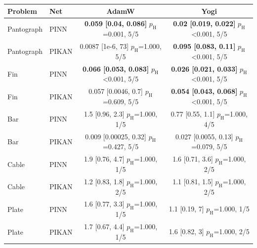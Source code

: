 \begin{tabular}{llcc}
\toprule
Problem & Net & AdamW & Yogi\\
\midrule
Pantograph & PINN & \makecell{\textbf{0.059 [0.04, 0.086]}\\{\footnotesize $p_{\mathrm{H}}$=0.001, 5/5}} & \makecell{\textbf{0.02 [0.019, 0.022]}\\{\footnotesize $p_{\mathrm{H}}$<0.001, 5/5}}\\
Pantograph & PIKAN & \makecell{0.0087 [1e-6, 73]\\{\footnotesize $p_{\mathrm{H}}$=1.000, 5/5}} & \makecell{\textbf{0.095 [0.083, 0.11]}\\{\footnotesize $p_{\mathrm{H}}$<0.001, 5/5}}\\
Fin & PINN & \makecell{\textbf{0.066 [0.053, 0.083]}\\{\footnotesize $p_{\mathrm{H}}$<0.001, 5/5}} & \makecell{\textbf{0.026 [0.021, 0.033]}\\{\footnotesize $p_{\mathrm{H}}$<0.001, 5/5}}\\
Fin & PIKAN & \makecell{0.057 [0.0046, 0.7]\\{\footnotesize $p_{\mathrm{H}}$=0.609, 5/5}} & \makecell{\textbf{0.054 [0.043, 0.068]}\\{\footnotesize $p_{\mathrm{H}}$<0.001, 5/5}}\\
Bar & PINN & \makecell{1.5 [0.96, 2.3]\\{\footnotesize $p_{\mathrm{H}}$=1.000, 1/5}} & \makecell{0.77 [0.55, 1.1]\\{\footnotesize $p_{\mathrm{H}}$=1.000, 4/5}}\\
Bar & PIKAN & \makecell{0.009 [0.00025, 0.32]\\{\footnotesize $p_{\mathrm{H}}$=0.427, 5/5}} & \makecell{0.027 [0.0055, 0.13]\\{\footnotesize $p_{\mathrm{H}}$=0.079, 5/5}}\\
Cable & PINN & \makecell{1.9 [0.76, 4.7]\\{\footnotesize $p_{\mathrm{H}}$=1.000, 1/5}} & \makecell{1.6 [0.71, 3.6]\\{\footnotesize $p_{\mathrm{H}}$=1.000, 2/5}}\\
Cable & PIKAN & \makecell{1.2 [0.83, 1.8]\\{\footnotesize $p_{\mathrm{H}}$=1.000, 2/5}} & \makecell{1.1 [0.81, 1.5]\\{\footnotesize $p_{\mathrm{H}}$=1.000, 2/5}}\\
Plate & PINN & \makecell{1.6 [0.77, 3.3]\\{\footnotesize $p_{\mathrm{H}}$=1.000, 1/5}} & \makecell{1.1 [0.19, 7]\\{\footnotesize $p_{\mathrm{H}}$=1.000, 1/5}}\\
Plate & PIKAN & \makecell{1.7 [0.67, 4.4]\\{\footnotesize $p_{\mathrm{H}}$=1.000, 1/5}} & \makecell{1.6 [0.82, 3]\\{\footnotesize $p_{\mathrm{H}}$=1.000, 2/5}}\\
\bottomrule
\end{tabular}